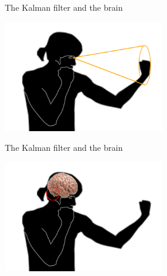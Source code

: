 \documentclass{beamer}
\begin{document}
\begin{frame}{The Kalman filter and the brain}
  \begin{center}
    \includegraphics[width=7cm]{boxing3.png}
  \end{center}
\end{frame}


\begin{frame}{The Kalman filter and the brain}
  \begin{center}
    \includegraphics[width=7cm]{boxing4.png}
  \end{center}
\end{frame}
\end{document}
